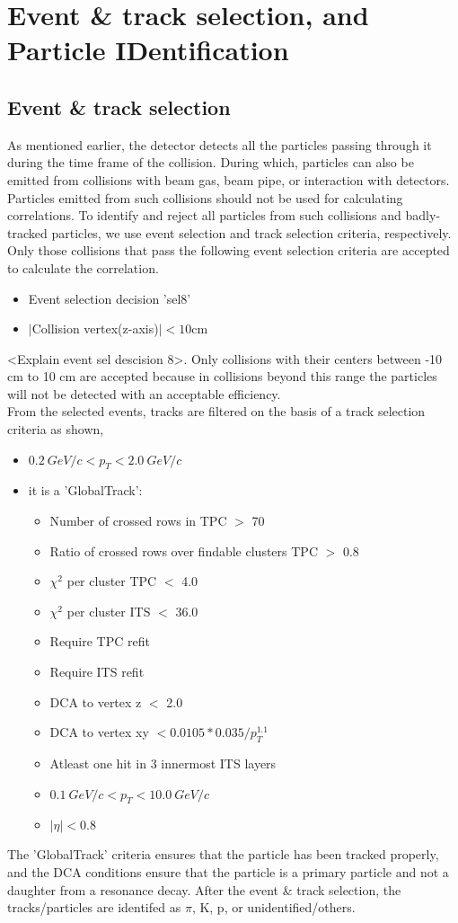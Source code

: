 \documentclass[12pt,a4paper,twoside]{report}
\begin{document}
\chapter{Event \& track selection, and Particle IDentification}\label{Ch:Selections}
\section{Event \& track selection}
As mentioned earlier, the detector detects all the particles passing through it during the time frame of the collision. During which, particles can also be emitted from collisions with beam gas, beam pipe, or interaction with detectors. Particles emitted from such collisions should not be used for calculating correlations. To identify and reject all particles from such collisions and badly-tracked particles, we use event selection and track selection criteria, respectively.\\ 

Only those collisions that pass the following event selection criteria are accepted to calculate the correlation.
\begin{itemize}[label=$\bullet$]
	\item Event selection decision 'sel8'
	\item $|$Collision vertex(z-axis)$| < 10$cm
\end{itemize}
<Explain event sel descision 8>. Only collisions with their centers between -10 cm to 10 cm are accepted because in collisions beyond this range the particles will not be detected with an acceptable efficiency.\\

From the selected events, tracks are filtered on the basis of a track selection criteria as shown,
\begin{itemize}[label=$\bullet$]
	\item $0.2\ GeV/c<p_T<2.0\ GeV/c$
	\item it is a 'GlobalTrack':
	\begin{itemize}
		\item Number of crossed rows in TPC $>$ 70
		\item Ratio of crossed rows over findable clusters TPC $>$ 0.8
		\item $\chi^2$ per cluster TPC $<$ 4.0
		\item $\chi^2$ per cluster ITS $<$ 36.0
		\item Require TPC refit
		\item Require ITS refit
		\item DCA to vertex z $<$ 2.0
		\item DCA to vertex xy  $<0.0105*0.035/p_T^{1.1}$
		\item Atleast one hit in 3 innermost ITS layers
		\item $0.1\ GeV/c<p_T<10.0\ GeV/c$
		\item $|\eta|<0.8$
	\end{itemize}
\end{itemize}
The 'GlobalTrack' criteria ensures that the particle has been tracked properly, and the DCA conditions ensure that the particle is a primary particle and not a daughter from a resonance decay.
After the event \& track selection, the tracks/particles are identifed as $\pi$, K, p, or unidentified/others.
\end{document}
